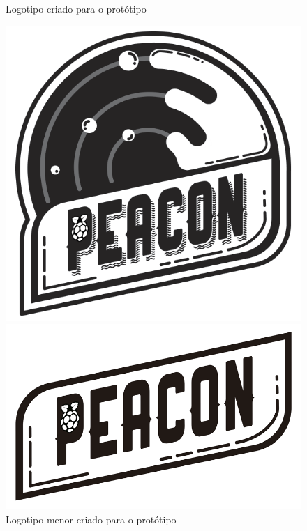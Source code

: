 \documentclass[
		12pt,				%
		openright,			%
		oneside,			%
		a4paper,			%
		chapter=TITLE,		%
		english,			%
		brazil				%
	]{abntex2}
\begin{document}
\begin{figure}[htb]
	\centering
 	\begin{minipage}{0.45\textwidth}
		\centering
		\caption{\label{fig:logo-peacon}Logotipo criado para o protótipo}
		\includegraphics[width=1\textwidth]{img/logo-peacon.png}
	\end{minipage}
	\hfill
	\begin{minipage}{0.45\textwidth}
		\centering
		\caption{\label{fig:logo-menor-peacon}Logotipo menor criado para o protótipo}
		\includegraphics[width=1\textwidth]{img/logo-menor-peacon.png}
	\end{minipage}
\end{figure}
\end{document}
